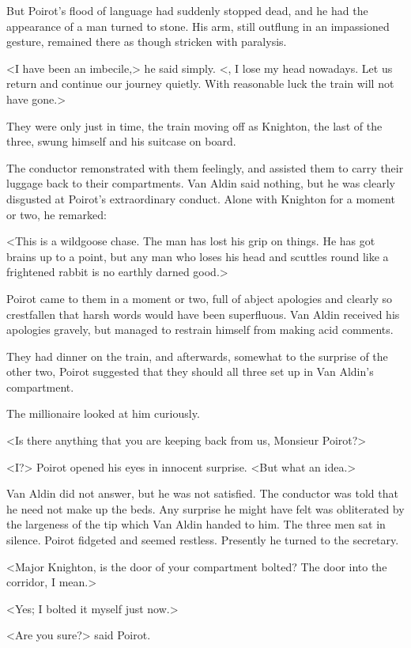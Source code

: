 But Poirot's flood of language had suddenly stopped dead, and he had the appearance of a man turned to stone. His arm, still outflung in an impassioned gesture, remained there as though stricken with paralysis.

<I have been an imbecile,> he said simply. <, I lose my head nowadays. Let us return and continue our journey quietly. With reasonable luck the train will not have gone.>

They were only just in time, the train moving off as Knighton, the last of the three, swung himself and his suitcase on board.

The conductor remonstrated with them feelingly, and assisted them to carry their luggage back to their compartments. Van Aldin said nothing, but he was clearly disgusted at Poirot's extraordinary conduct. Alone with Knighton for a moment or two, he remarked:

<This is a wildgoose chase. The man has lost his grip on things. He has got brains up to a point, but any man who loses his head and scuttles round like a frightened rabbit is no earthly darned good.>

Poirot came to them in a moment or two, full of abject apologies and clearly so crestfallen that harsh words would have been superfluous. Van Aldin received his apologies gravely, but managed to restrain himself from making acid comments.

They had dinner on the train, and afterwards, somewhat to the surprise of the other two, Poirot suggested that they should all three set up in Van Aldin's compartment.

The millionaire looked at him curiously.

<Is there anything that you are keeping back from us, Monsieur Poirot?>

<I?> Poirot opened his eyes in innocent surprise. <But what an idea.>

Van Aldin did not answer, but he was not satisfied. The conductor was told that he need not make up the beds. Any surprise he might have felt was obliterated by the largeness of the tip which Van Aldin handed to him. The three men sat in silence. Poirot fidgeted and seemed restless. Presently he turned to the secretary.

<Major Knighton, is the door of your compartment bolted? The door into the corridor, I mean.>

<Yes; I bolted it myself just now.>

<Are you sure?> said Poirot.

